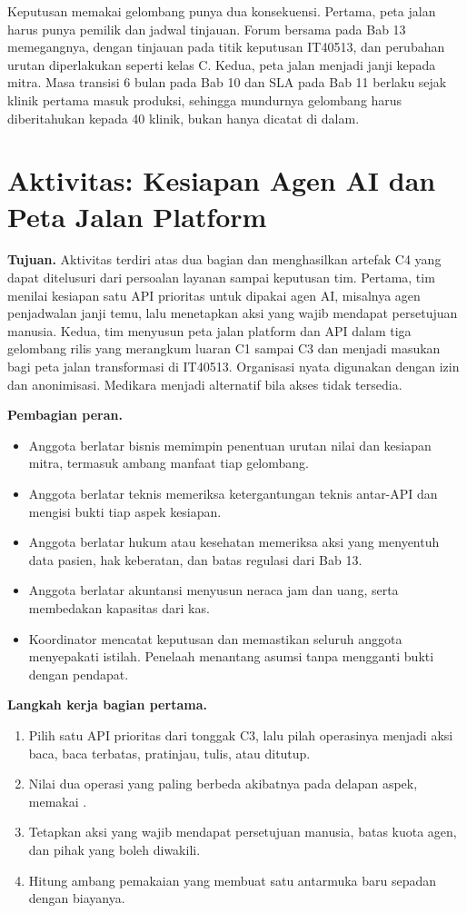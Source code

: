 Keputusan memakai gelombang punya dua konsekuensi. Pertama, peta jalan harus punya pemilik dan jadwal tinjauan. Forum bersama pada Bab 13 memegangnya, dengan tinjauan pada titik keputusan IT40513, dan perubahan urutan diperlakukan seperti kelas C. Kedua, peta jalan menjadi janji kepada mitra. Masa transisi 6 bulan pada Bab 10 dan SLA pada Bab 11 berlaku sejak klinik pertama masuk produksi, sehingga mundurnya gelombang harus diberitahukan kepada 40 klinik, bukan hanya dicatat di dalam.

\section{Aktivitas: Kesiapan Agen AI dan Peta Jalan Platform}

\textbf{Tujuan.} Aktivitas terdiri atas dua bagian dan menghasilkan artefak C4 yang dapat ditelusuri dari persoalan layanan sampai keputusan tim. Pertama, tim menilai kesiapan satu API prioritas untuk dipakai agen AI, misalnya agen penjadwalan janji temu, lalu menetapkan aksi yang wajib mendapat persetujuan manusia. Kedua, tim menyusun peta jalan platform dan API dalam tiga gelombang rilis yang merangkum luaran C1 sampai C3 dan menjadi masukan bagi peta jalan transformasi di IT40513. Organisasi nyata digunakan dengan izin dan anonimisasi. Medikara menjadi alternatif bila akses tidak tersedia.

\textbf{Pembagian peran.}
\begin{itemize}
  \item Anggota berlatar bisnis memimpin penentuan urutan nilai dan kesiapan mitra, termasuk ambang manfaat tiap gelombang.
  \item Anggota berlatar teknis memeriksa ketergantungan teknis antar-API dan mengisi bukti tiap aspek kesiapan.
  \item Anggota berlatar hukum atau kesehatan memeriksa aksi yang menyentuh data pasien, hak keberatan, dan batas regulasi dari Bab 13.
  \item Anggota berlatar akuntansi menyusun neraca jam dan uang, serta membedakan kapasitas dari kas.
  \item Koordinator mencatat keputusan dan memastikan seluruh anggota menyepakati istilah. Penelaah menantang asumsi tanpa mengganti bukti dengan pendapat.
\end{itemize}

\textbf{Langkah kerja bagian pertama.}
\begin{enumerate}
  \item Pilih satu API prioritas dari tonggak C3, lalu pilah operasinya menjadi aksi baca, baca terbatas, pratinjau, tulis, atau ditutup.
  \item Nilai dua operasi yang paling berbeda akibatnya pada delapan aspek, memakai .
  \item Tetapkan aksi yang wajib mendapat persetujuan manusia, batas kuota agen, dan pihak yang boleh diwakili.
  \item Hitung ambang pemakaian yang membuat satu antarmuka baru sepadan dengan biayanya.
\end{enumerate}

